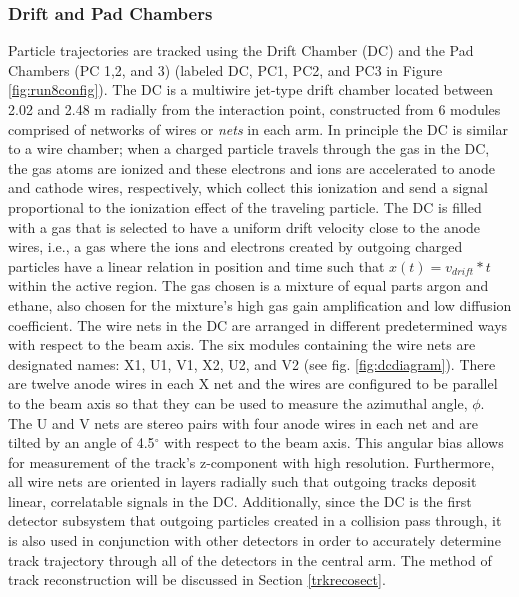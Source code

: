 \subsubsection{Drift and Pad Chambers}
\label{sect:dcpc}
Particle trajectories are tracked using the Drift Chamber (DC) and the Pad Chambers (PC 1,2, and 3) \citep{DCfocus} (labeled DC, PC1, PC2, and PC3 in Figure \ref{fig:run8config}). The DC is a multiwire jet-type drift chamber located between 2.02 and 2.48 m radially from the interaction point, constructed from 6 modules comprised of networks of wires or \textit{nets} in each arm. In principle the DC is similar to a wire chamber; when a charged particle travels through the gas in the DC, the gas atoms are ionized and these electrons and ions are accelerated to anode and cathode wires, respectively, which collect this ionization and send a signal proportional to the ionization effect of the traveling particle. The DC is filled with a gas that is selected to have a uniform drift velocity close to the anode wires, i.e., a gas where the ions and electrons created by outgoing charged particles have a linear relation in position and time such that $x(t) = v_{drift} * t$ within the active region. The gas chosen is a mixture of equal parts argon and ethane, also chosen for the mixture's high gas gain amplification and low diffusion coefficient. The wire nets in the DC are arranged in different predetermined ways with respect to the beam axis. The six modules containing the wire nets are designated names: X1, U1, V1, X2, U2, and V2 (see fig. \ref{fig:dcdiagram}). There are twelve anode wires in each X net and the wires are configured to be parallel to the beam axis so that they can be used to measure the azimuthal angle, $\phi$. The U and V nets are stereo pairs with four anode wires in each net and are tilted by an angle of 4.5$^\circ$ with respect to the beam axis. This angular bias allows for measurement of the track's z-component with high resolution. Furthermore, all wire nets are oriented in layers radially such that outgoing tracks deposit linear, correlatable signals in the DC. Additionally, since the DC is the first detector subsystem that outgoing particles created in a collision pass through, it is also used in conjunction with other detectors in order to accurately determine track trajectory through all of the detectors in the central arm. The method of track reconstruction will be discussed in Section \ref{trkrecosect}.

